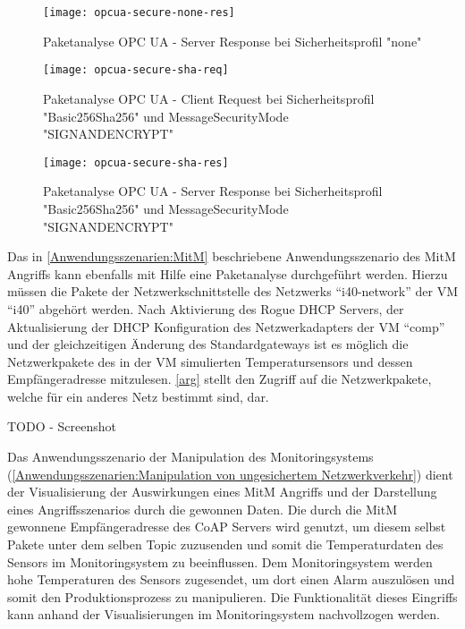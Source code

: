 \begin{figure}[h]
  \centering
  \texttt{[image: opcua-secure-none-res]}
  \caption{Paketanalyse OPC UA - Server Response bei Sicherheitsprofil "none"} 
  \label{Analyse:opcua-secure-none-res}
\end{figure}

\begin{figure}[h]
  \centering
  \texttt{[image: opcua-secure-sha-req]}
  \caption{Paketanalyse OPC UA - Client Request bei Sicherheitsprofil "Basic256Sha256" und MessageSecurityMode "SIGNANDENCRYPT"} 
  \label{Analyse:opcua-secure-sha-req}
\end{figure}

\begin{figure}[h]
  \centering
  \texttt{[image: opcua-secure-sha-res]}
  \caption{Paketanalyse OPC UA - Server Response bei Sicherheitsprofil "Basic256Sha256" und MessageSecurityMode "SIGNANDENCRYPT"} 
  \label{Analyse:opcua-secure-sha-res}
\end{figure}

Das in \autoref{Anwendungsszenarien:MitM} beschriebene Anwendungsszenario des \ac{MitM} Angriffs kann ebenfalls mit Hilfe eine Paketanalyse durchgeführt werden. Hierzu müssen die Pakete der Netzwerkschnittstelle des Netzwerks "`i40-network"' der \ac{VM} "`i40"' abgehört werden. Nach Aktivierung des Rogue \ac{DHCP} Servers, der Aktualisierung der \ac{DHCP} Konfiguration des Netzwerkadapters der \ac{VM} "`comp"' und der gleichzeitigen Änderung des Standardgateways ist es möglich die Netzwerkpakete des in der \ac{VM} simulierten Temperatursensors und dessen Empfängeradresse mitzulesen. \autoref{arg} stellt den Zugriff auf die Netzwerkpakete, welche für ein anderes Netz bestimmt sind, dar.

TODO - Screenshot

Das Anwendungsszenario der Manipulation des Monitoringsystems (\autoref{Anwendungsszenarien:Manipulation von ungesichertem Netzwerkverkehr}) dient der Visualisierung der Auswirkungen eines \ac{MitM} Angriffs und der Darstellung eines Angriffsszenarios durch die gewonnen Daten. Die durch die \ac{MitM} gewonnene Empfängeradresse des \ac{CoAP} Servers wird genutzt, um diesem selbst Pakete unter dem selben Topic zuzusenden und somit die Temperaturdaten des Sensors im Monitoringsystem zu beeinflussen. Dem Monitoringsystem werden hohe Temperaturen des Sensors zugesendet, um dort einen Alarm auszulösen und somit den Produktionsprozess zu manipulieren. Die Funktionalität dieses Eingriffs kann anhand der Visualisierungen im Monitoringsystem nachvollzogen werden.